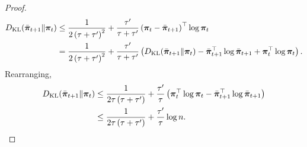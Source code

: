\begin{proof}
\begin{equation*}
\begin{split}
    D_{\mathrm{KL}}{\left( \bar{{\boldsymbol{\pi}}}_{t+1} \middle\| {\boldsymbol{\pi}}_t \right)} &\le \frac{1}{2\left(\tau + \tau^\prime\right)^2} + \frac{\tau^\prime}{\tau + \tau^\prime} \left( {\boldsymbol{\pi}}_t - \bar{{\boldsymbol{\pi}}}_{t+1} \right)^\top \log{{\boldsymbol{\pi}}_t} \\
    &= \frac{1}{2\left(\tau + \tau^\prime\right)^2} + \frac{\tau^\prime}{\tau + \tau^\prime} \left( D_{\mathrm{KL}}{\left( \bar{{\boldsymbol{\pi}}}_{t+1} \middle\| {\boldsymbol{\pi}}_t \right)} - \bar{{\boldsymbol{\pi}}}_{t+1}^\top \log{\bar{{\boldsymbol{\pi}}}_{t+1}} + {\boldsymbol{\pi}}_t^\top \log{{\boldsymbol{\pi}}_t} \right). 
\end{split}
\end{equation*}
Rearranging,
\begin{equation*}
\begin{split}
    D_{\mathrm{KL}}{\left( \bar{{\boldsymbol{\pi}}}_{t+1} \middle\| {\boldsymbol{\pi}}_t \right)} &\le \frac{1}{2\tau \left(\tau + \tau^\prime\right)} + \frac{\tau^\prime}{\tau} \left( {\boldsymbol{\pi}}_t^\top \log{{\boldsymbol{\pi}}_t} -  \bar{{\boldsymbol{\pi}}}_{t+1}^\top \log{\bar{{\boldsymbol{\pi}}}_{t+1}}  \right) \\
    &\le \frac{1}{2\tau \left(\tau + \tau^\prime\right)} + \frac{\tau^\prime}{\tau} \log{n}. \qedhere
\end{split}
\end{equation*}
\end{proof}

